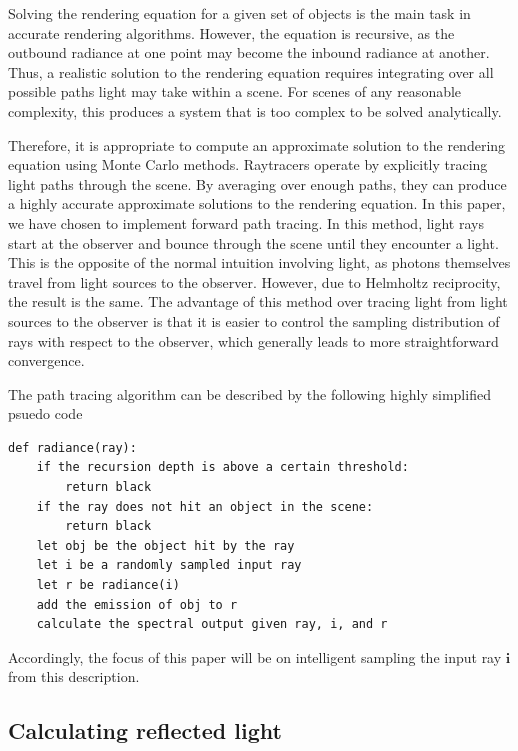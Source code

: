 \documentclass[12pt]{article}
\begin{document}
Solving the rendering equation for a given set of objects is the main task in accurate rendering algorithms.
However, the equation is recursive, as the outbound radiance at one point may become the inbound radiance at another.
Thus, a realistic solution to the rendering equation requires integrating over all possible paths light may take within a scene.
For scenes of any reasonable complexity, this produces a system that is too complex to be solved analytically.

Therefore, it is appropriate to compute an approximate solution to the rendering equation using Monte Carlo methods.
Raytracers operate by explicitly tracing light paths through the scene.
By averaging over enough paths, they can produce a highly accurate approximate solutions to the rendering equation.
In this paper, we have chosen to implement forward path tracing.
In this method, light rays start at the observer and bounce through the scene until they encounter a light.
This is the opposite of the normal intuition involving light, as photons themselves travel from light sources to the observer.
However, due to Helmholtz reciprocity, the result is the same.
The advantage of this method over tracing light from light sources to the observer is that it is easier to control the sampling distribution of rays with respect to the observer, which generally leads to more straightforward convergence.

The path tracing algorithm can be described by the following highly simplified psuedo code
\begin{lstlisting}
def radiance(ray):
    if the recursion depth is above a certain threshold:
        return black
    if the ray does not hit an object in the scene:
        return black
    let obj be the object hit by the ray
    let i be a randomly sampled input ray
    let r be radiance(i)
    add the emission of obj to r
    calculate the spectral output given ray, i, and r
\end{lstlisting}
Accordingly, the focus of this paper will be on intelligent sampling the input ray \(\bm i\) from this description.

\subsection{Calculating reflected light}
\end{document}
